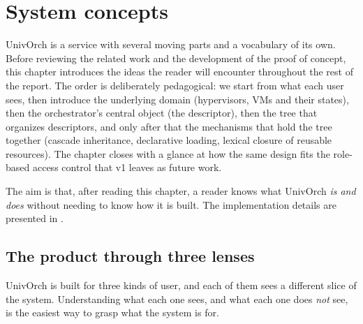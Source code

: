 %

\chapter{System concepts}
\label{ch:conceptos}

UnivOrch is a service with several moving parts and a vocabulary of
its own. Before reviewing the related work and the development of
the proof of concept, this chapter introduces the ideas the reader
will encounter throughout the rest of the report. The order is
deliberately pedagogical: we start from what each user sees, then
introduce the underlying domain (hypervisors, VMs and their
states), then the orchestrator's central object (the descriptor),
then the tree that organizes descriptors, and only after that the
mechanisms that hold the tree together (cascade inheritance,
declarative loading, lexical closure of reusable resources). The
chapter closes with a glance at how the same design fits the
role-based access control that v1 leaves as future work.

The aim is that, after reading this chapter, a reader knows what
UnivOrch \emph{is and does} without needing to know how it is built.
The implementation details are presented in .

\section{The product through three lenses}
\label{sec:tres-lentes}

UnivOrch is built for three kinds of user, and each of them sees a
different slice of the system. Understanding what each one sees,
and what each one does \emph{not} see, is the easiest way to grasp
what the system is for.

